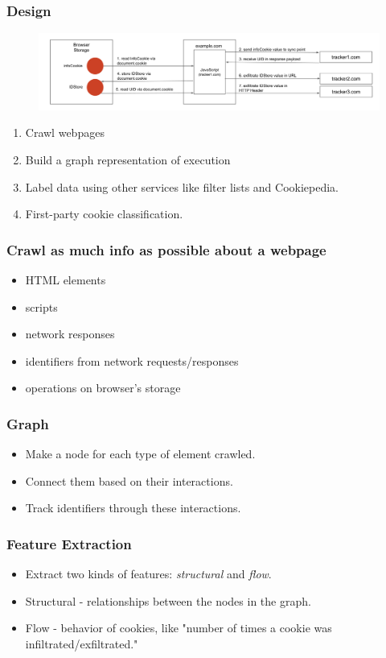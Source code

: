 \documentclass{beamer}
\begin{document}
\begin{frame}
\frametitle{Design}

\begin{figure}
\includegraphics[scale=0.2]{img/graphconstruction}
\end{figure}

\begin{enumerate}
\item Crawl webpages
\item Build a graph representation of execution
\item Label data using other services like filter lists and Cookiepedia.
\item First-party cookie classification.
\end{enumerate}

\end{frame}

\begin{frame}
\frametitle{Crawl as much info as possible about a webpage}
\begin{itemize}
\item HTML elements
\item scripts
\item network responses
\item identifiers from network requests/responses
\item operations on browser's storage
\end{itemize}
\end{frame}

\begin{frame}
\frametitle{Graph}
\begin{itemize}
\item Make a node for each type of element crawled.
\item Connect them based on their interactions.
\item Track identifiers through these interactions.
\end{itemize}
\end{frame}

\begin{frame}
\frametitle{Feature Extraction}
\begin{itemize}
\item Extract two kinds of features: \textit{structural} and \textit{flow}.
\item Structural - relationships between the nodes in the graph.
\item Flow - behavior of cookies, like "number of times a cookie was infiltrated/exfiltrated."
\end{itemize}
\end{frame}
\end{document}
